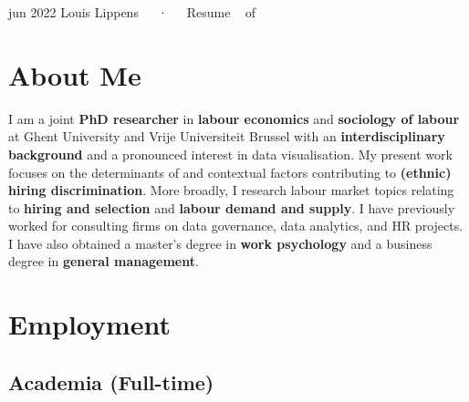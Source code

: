 \documentclass[11pt,a4paper,]{awesome-cv}
\begin{document}
\makecvheader

\makecvfooter
  {jun 2022}
    {Louis Lippens~~~·~~~Resume}
  {\thepage~ of \pageref{LastPage}~}





\hypertarget{about-me}{%
\section{About Me}\label{about-me}}

\footnotesize

I am a joint \textbf{PhD researcher} in \textbf{labour economics} and
\textbf{sociology of labour} at Ghent University and Vrije Universiteit
Brussel with an \textbf{interdisciplinary background} and a pronounced
interest in data visualisation. My present work focuses on the
determinants of and contextual factors contributing to \textbf{(ethnic)
hiring discrimination}. More broadly, I research labour market topics
relating to \textbf{hiring and selection} and \textbf{labour demand and
supply}. I have previously worked for consulting firms on data
governance, data analytics, and HR projects. I have also obtained a
master's degree in \textbf{work psychology} and a business degree in
\textbf{general management}. \normalsize

\hypertarget{employment}{%
\section{Employment}\label{employment}}

\medskip

\hypertarget{academia-full-time}{%
\subsection{Academia (Full-time)}\label{academia-full-time}}
\end{document}
